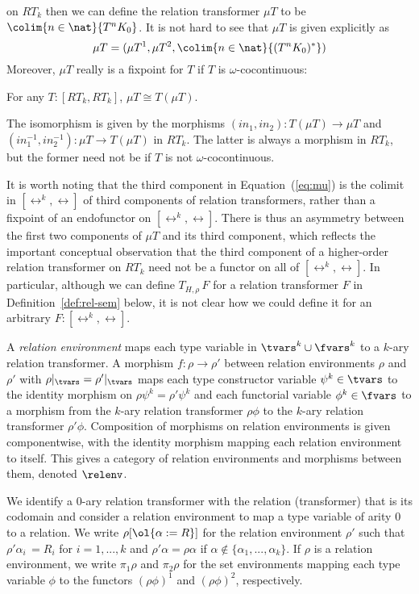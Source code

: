 \documentclass{lmcs}
\theoremstyle{plain}\newtheorem{satz}[thm]{Satz}
\begin{document}
on $RT_k$ then we can define the relation transformer $\mu T$ to be
$\colim{n \in \nat}{T^n K_0}$. It is not hard to see that $\mu T$ is
given explicitly as
\begin{equation}\label{eq:mu}
\mu T = (\mu T^1,\mu T^2, \colim{n \in \nat}{(T^nK_0)^*})
\end{equation}
Moreover, $\mu T$ really is a fixpoint for $T$ if $T$ is
$\omega$-cocontinuous:
\begin{lem}\label{lem:fp}
For any $T : [RT_k,RT_k]$, $\mu T \cong T(\mu T)$.
\end{lem}
\noindent
The isomorphism is given by the morphisms $(\mathit{in}_1,
\mathit{in}_2) : T(\mu T) \to \mu T$ and $(in_1^{-1}, in_2^{-1}) : \mu
T \to T(\mu T)$ in $RT_k$. The latter is always a morphism in $RT_k$,
but the former need not be if $T$ is not $\omega$-cocontinuous.

It is worth noting that the third component in Equation~(\ref{eq:mu})
is the colimit in $[\rel^k,\rel]$ of third components of relation
transformers, rather than a fixpoint of an endofunctor on
$[\rel^k,\rel]$. There is thus an asymmetry between the first two
components of $\mu T$ and its third component, which reflects the
important conceptual observation that the third component of a
higher-order relation transformer on $RT_k$ need not be a functor on
all of $[\rel^k,\rel]$. In particular, although we can define
$T_{H,\rho}\, F$ for a relation transformer $F$ in
Definition~\ref{def:rel-sem} below, it is not clear how we could
define it for an arbitrary $F : [\rel^k,\rel]$.

\begin{defi}\label{def:reln-env}
A {\em relation environment} maps each type variable in $\tvars^k \cup
\fvars^k$ to a $k$-ary relation transformer.  A morphism $f : \rho \to
\rho'$ between relation environments $\rho$ and $\rho'$ with
$\rho|_\tvars = \rho'|_\tvars$ maps each type constructor variable
$\psi^k \in \tvars$ to the identity morphism on $\rho \psi^k = \rho'
\psi^k$ and each functorial variable $\phi^k \in \fvars$ to a morphism
from the $k$-ary relation transformer $\rho \phi$ to the $k$-ary
relation transformer $\rho' \phi$. Composition of morphisms on
relation environments is given componentwise, with the identity
morphism mapping each relation environment to itself. This gives a
category of relation environments and morphisms between them, denoted
$\relenv$.
\end{defi}
We identify a $0$-ary relation transformer with the relation
(transformer) that is its codomain and consider a relation environment
to map a type variable of arity $0$ to a relation.  We write
$\rho[\ol{\alpha := R}]$ for the relation environment $\rho'$ such
that $\rho' \alpha_i \, = R_i$ for $i = 1,...,k$ and $\rho' \alpha =
\rho\alpha$ if $\alpha \not \in \{\alpha_1,...,\alpha_k\}$.  If $\rho$
is a relation environment, we write $\pi_1 \rho$ and $\pi_2 \rho$ for
the set environments mapping each type variable $\phi$ to the functors
$(\rho\phi)^1$ and $(\rho\phi)^2$, respectively.
\end{document}
